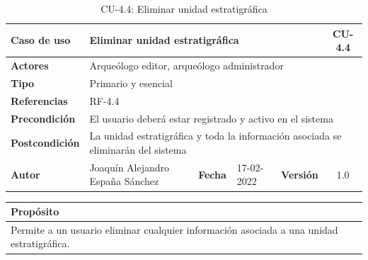     \begin{table}[H]
    \begin{center}
        \begin{adjustbox}{width=\textwidth}
        \begin{tabular}{ | l | l | l | l | c | c | } 
            \hline
            \textbf{Caso de uso} & \multicolumn{4}{l|}{Eliminar unidad estratigráfica} & \cellcolor{gray!50} \textbf{CU-4.4}\\
            \hline
            \textbf{Actores} & \multicolumn{5}{p{0.9\linewidth}|}{Arqueólogo editor, arqueólogo administrador} \\
            \hline
            \textbf{Tipo} & \multicolumn{5}{l|}{Primario y esencial} \\
            \hline
            \textbf{Referencias} & \multicolumn{3}{l|}{RF-4.4} & \multicolumn{2}{l|}{ }\\
            \hline
            \textbf{Precondición} & \multicolumn{5}{l|}{El usuario deberá estar registrado y activo en el sistema} \\
            \hline
            \textbf{Postcondición} & \multicolumn{5}{l|}{La unidad estratigráfica y toda la información asociada se
            eliminarán del sistema} \\
            \hline
            \textbf{Autor} & \multicolumn{1}{p{0.25\linewidth}|}{Joaquín Alejandro España Sánchez} & \textbf{Fecha} & 
            17-02-2022     & \textbf{Versión}                                                      & 1.0\\
            \hline
        \end{tabular}
        \end{adjustbox}
        \caption{CU-4.4: Eliminar unidad estratigráfica}
        \label{tab:delete-ue}
    \end{center}
    \end{table}

    \begin{table}[H]
        \centering
        \begin{tabularx}{\textwidth}{@{} |L |@{}} \hline
            \textbf{Propósito} \\
            \hline
            Permite a un usuario eliminar cualquier información asociada a una unidad
            estratigráfica. \\
            \hline
        \end{tabularx}
    \end{table}

